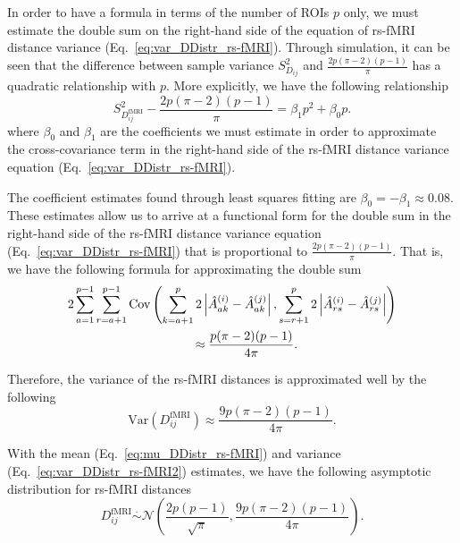 \documentclass[aoas]{imsart}
\begin{document}
In order to have a formula in terms of the number of ROIs $p$ only, we must estimate the double sum on the right-hand side of the equation of rs-fMRI distance variance (Eq.~\ref{eq:var_DDistr_rs-fMRI}). Through simulation, it can be seen that the difference between sample variance $S^2_{D_{ij}}$ and $\frac{2p(\pi-2)(p-1)}{\pi}$ has a quadratic relationship with $p$. More explicitly, we have the following relationship
%
\begin{equation}\label{eq:estimate_cov}
S^2_{D^\text{fMRI}_{ij}} - \frac{2p(\pi-2)(p-1)}{\pi} = \beta_1 p^2 + \beta_0 p.
\end{equation}
%
where $\beta_0$ and $\beta_1$ are the coefficients we must estimate in order to approximate the cross-covariance term in the right-hand side of the rs-fMRI distance variance equation (Eq.~\ref{eq:var_DDistr_rs-fMRI}).

The coefficient estimates found through least squares fitting are $\beta_0 = - \beta_1 \approx 0.08$. These estimates allow us to arrive at a functional form for the double sum in the right-hand side of the rs-fMRI distance variance equation (Eq.~\ref{eq:var_DDistr_rs-fMRI}) that is proportional to $\frac{2p(\pi-2)(p-1)}{\pi}$. That is, we have the following formula for approximating the double sum
%
\begin{equation}\label{eq:estimate_cov_form}
\begin{aligned}
&2\sum_{a = 1}^{p-1} \sum_{r=a+1}^{p-1} \text{Cov}\left(\sum_{k=a+1}^{p} 2\left|\hat{A}^{(i)}_{ak} - \hat{A}^{(j)}_{ak}\right|, \sum_{s=r+1}^{p} 2\left|\hat{A}^{(i)}_{rs} - \hat{A}^{(j)}_{rs}\right|\right) \\ &\hspace{3.5cm}\approx \frac{p(\pi - 2)(p - 1)}{4\pi}.
\end{aligned}
\end{equation}

Therefore, the variance of the rs-fMRI distances is approximated well by the following
%
\begin{equation}\label{eq:var_DDistr_rs-fMRI2}
\text{Var}(D^\text{fMRI}_{ij}) \approx \frac{9p(\pi - 2)(p-1)}{4\pi}.
\end{equation}

With the mean (Eq.~\ref{eq:mu_DDistr_rs-fMRI}) and variance (Eq.~\ref{eq:var_DDistr_rs-fMRI2}) estimates, we have the following asymptotic distribution for rs-fMRI distances
%
\begin{equation}\label{eq:DDistr_rs-fMRI}
D^\text{fMRI}_{ij} \overset{.}{\sim} \mathcal{N}\left(\frac{2p(p-1)}{\sqrt{\pi}}, \frac{9p(\pi - 2)(p-1)}{4\pi}\right).
\end{equation}
\end{document}
